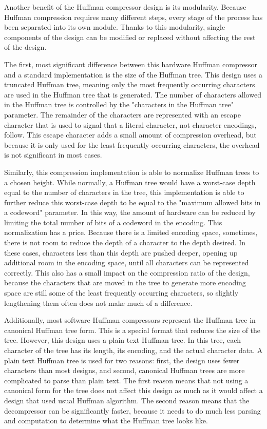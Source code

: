 \documentclass[doublespace,nopageskip]{VTthesis}
\begin{document}
Another benefit of the Huffman compressor design is its modularity. Because Huffman compression requires many different steps, every stage of the process has been separated into its own module. Thanks to this modularity, single components of the design can be modified or replaced without affecting the rest of the design.

The first, most significant difference between this hardware Huffman compressor and a standard implementation is the size of the Huffman tree. This design uses a truncated Huffman tree, meaning only the most frequently occurring characters are used in the Huffman tree that is generated. The number of characters allowed in the Huffman tree is controlled by the "characters in the Huffman tree" parameter. The remainder of the characters are represented with an escape character that is used to signal that a literal character, not character encodings, follow. This escape character adds a small amount of compression overhead, but because it is only used for the least frequently occurring characters, the overhead is not significant in most cases.

Similarly, this compression implementation is able to normalize Huffman trees to a chosen height. While normally, a Huffman tree would have a worst-case depth equal to the number of characters in the tree, this implementation is able to further reduce this worst-case depth to be equal to the "maximum allowed bits in a codeword" parameter. In this way, the amount of hardware can be reduced by limiting the total number of bits of a codeword in the encoding. This normalization has a price. Because there is a limited encoding space, sometimes, there is not room to reduce the depth of a character to the depth desired. In these cases, characters less than this depth are pushed deeper, opening up additional room in the encoding space, until all characters can be represented correctly. This also has a small impact on the compression ratio of the design, because the characters that are moved in the tree to generate more encoding space are still some of the least frequently occurring characters, so slightly lengthening them often does not make much of a difference.

Additionally, most software Huffman compressors represent the Huffman tree in canonical Huffman tree form. This is a special format that reduces the size of the tree. However, this design uses a plain text Huffman tree. In this tree, each character of the tree has its length, its encoding, and the actual character data. A plain text Huffman tree is used for two reasons: first, the design uses fewer characters than most designs, and second, canonical Huffman trees are more complicated to parse than plain text. The first reason means that not using a canonical form for the tree does not affect this design as much as it would affect a design that used usual Huffman algorithm. The second reason means that the decompressor can be significantly faster, because it needs to do much less parsing and computation to determine what the Huffman tree looks like. 
\end{document}

